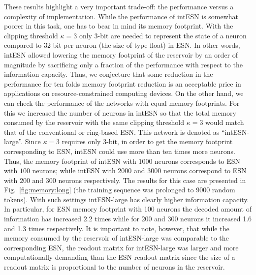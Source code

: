 These results highlight a very important trade-off: the performance versus a complexity of implementation. While
the performance of intESN is somewhat poorer in this task, one has to bear in mind its memory footprint. With the
clipping threshold $\kappa=3$ only 3-bit are needed to represent the state of a neuron compared to 32-bit
per neuron (the size of type float) in ESN. 
In other words, intESN allowed lowering the memory footprint of the reservoir by an order of magnitude by sacrificing only a fraction of the performance with respect to the information capacity. 
Thus, we conjecture that some reduction in the performance for ten folds
memory footprint reduction is an acceptable price in applications on resource-constrained computing
devices.
On the other hand, we can check the performance of the networks with equal memory
footprints. 
For this we increased the number of neurons in intESN so that the total memory consumed by
the reservoir with the same clipping threshold $\kappa=3$ would match that of the conventional or ring-based ESN. 
This network is denoted as ``intESN-large''.
Since $\kappa=3$ requires only 3-bit, in order to get the memory footprint corresponding to ESN, intESN could use more than ten times more neurons. 
Thus, the memory footprint of intESN with $1000$ neurons corresponds to ESN with $100$ neurons; while intESN with $2000$ and $3000$  neurons correspond to ESN with $200$ and $300$ neurons respectively.
 The results for this case are presented in Fig.~\ref{fig:memory:long} (the training sequence was prolonged to
9000 random tokens). With such settings intESN-large has clearly higher information capacity. In
particular, for ESN memory footprint with 100 neurons the decoded amount of information has increased
2.2 times while for 200 and 300 neurons it increased 1.6 and 1.3 times respectively.
It is important to note, however, that while the memory consumed by the reservoir of intESN-large was comparable to the corresponding ESN, the readout matrix for intESN-large was larger and more computationally demanding than the ESN readout matrix since the size of a readout matrix is proportional to the number of neurons in the reservoir. 






